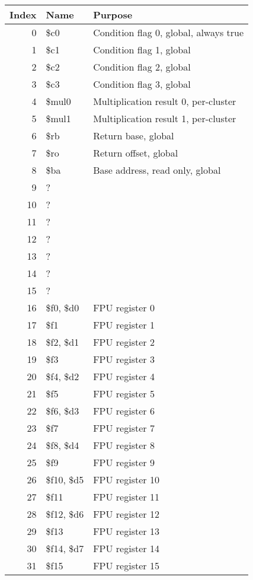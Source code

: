 \documentclass[10pt,DIV12]{scrartcl}
\begin{document}
\begin{tabular}{rll}
  \toprule
  Index & Name & Purpose \\
  \midrule
  0 & \$c0 & Condition flag 0, global, always true \\
  1 & \$c1 & Condition flag 1, global \\
  2 & \$c2 & Condition flag 2, global \\
  3 & \$c3 & Condition flag 3, global \\
  \cmidrule{1-3}
  4 & \$mul0 & Multiplication result 0, per-cluster \\
  5 & \$mul1 & Multiplication result 1, per-cluster \\
  \cmidrule{1-3}
  6 & \$rb & Return base, global \\
  7 & \$ro & Return offset, global \\
  8 & \$ba & Base address, read only, global \\
  \cmidrule{1-3}
  9 & ? & \\
  10 & ? & \\
  11 & ? & \\
  12 & ? & \\
  13 & ? & \\
  14 & ? & \\
  15 & ? & \\
  \cmidrule{1-3}
  16 & \$f0, \$d0 & FPU register 0 \\
  17 & \$f1 & FPU register 1 \\
  18 & \$f2, \$d1 & FPU register 2 \\
  19 & \$f3 & FPU register 3 \\
  20 & \$f4, \$d2 & FPU register 4 \\
  21 & \$f5 & FPU register 5 \\
  22 & \$f6, \$d3 & FPU register 6 \\
  23 & \$f7 & FPU register 7 \\
  24 & \$f8, \$d4 & FPU register 8 \\
  25 & \$f9 & FPU register 9 \\
  26 & \$f10, \$d5 & FPU register 10 \\
  27 & \$f11 & FPU register 11 \\
  28 & \$f12, \$d6 & FPU register 12 \\
  29 & \$f13 & FPU register 13 \\
  30 & \$f14, \$d7 & FPU register 14 \\
  31 & \$f15 & FPU register 15 \\
  \bottomrule
\end{tabular}
\end{document}
